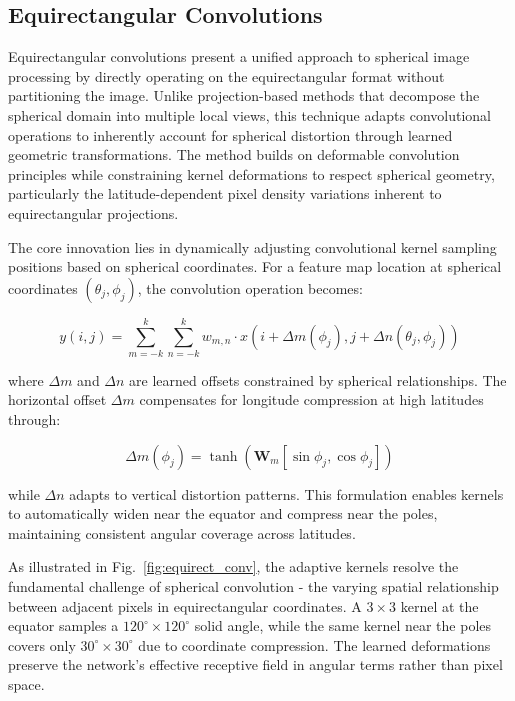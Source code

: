 \subsection{Equirectangular Convolutions}
\label{ssec:equirect_conv}

Equirectangular convolutions present a unified approach to spherical image processing by directly operating on the equirectangular format without partitioning the image. Unlike projection-based methods that decompose the spherical domain into multiple local views, this technique adapts convolutional operations to inherently account for spherical distortion through learned geometric transformations. The method builds on deformable convolution principles \cite{tateno2018distortion} while constraining kernel deformations to respect spherical geometry, particularly the latitude-dependent pixel density variations inherent to equirectangular projections.

The core innovation lies in dynamically adjusting convolutional kernel sampling positions based on spherical coordinates. For a feature map location at spherical coordinates $(\theta_j, \phi_j)$, the convolution operation becomes:

\begin{equation}
y(i,j) = \sum_{m=-k}^k \sum_{n=-k}^k w_{m,n} \cdot x\left(i + \Delta m(\phi_j), j + \Delta n(\theta_j,\phi_j)\right)
\end{equation}

where $\Delta m$ and $\Delta n$ are learned offsets constrained by spherical relationships. The horizontal offset $\Delta m$ compensates for longitude compression at high latitudes through:

\begin{equation}
\Delta m(\phi_j) = \tanh\left(\mathbf{W}_m [\sin\phi_j, \cos\phi_j]\right)
\end{equation}

while $\Delta n$ adapts to vertical distortion patterns. This formulation enables kernels to automatically widen near the equator and compress near the poles, maintaining consistent angular coverage across latitudes.

As illustrated in Fig.~\ref{fig:equirect_conv}, the adaptive kernels resolve the fundamental challenge of spherical convolution - the varying spatial relationship between adjacent pixels in equirectangular coordinates. A $3\times3$ kernel at the equator samples a $120^\circ\times120^\circ$ solid angle, while the same kernel near the poles covers only $30^\circ\times30^\circ$ due to coordinate compression. The learned deformations preserve the network's effective receptive field in angular terms rather than pixel space.

